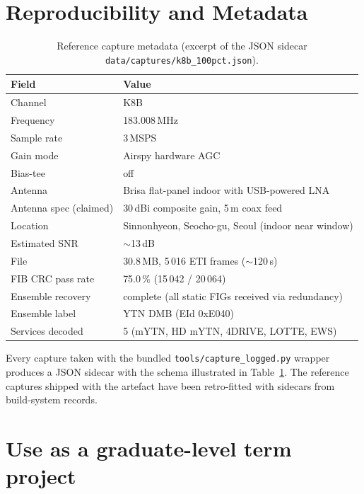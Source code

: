 \documentclass[11pt,a4paper]{article}
\begin{document}
\section{Reproducibility and Metadata}\label{sec:reproducibility}

\begin{table}[t]
\centering
\caption{Reference capture metadata (excerpt of the JSON sidecar
\texttt{data/captures/k8b\_100pct.json}).}
\label{tab:capture-meta}
\begin{tabular}{ll}
\toprule
Field & Value \\
\midrule
Channel              & K8B \\
Frequency            & 183.008\,MHz \\
Sample rate          & 3\,MSPS \\
Gain mode            & Airspy hardware AGC \\
Bias-tee             & off \\
Antenna              & Brisa flat-panel indoor with USB-powered LNA \\
Antenna spec (claimed)& 30\,dBi composite gain, 5\,m coax feed \\
Location             & Sinnonhyeon, Seocho-gu, Seoul (indoor near window) \\
Estimated SNR        & $\sim$13\,dB \\
File                 & 30.8\,MB, 5\,016 ETI frames ($\sim$120\,s) \\
FIB CRC pass rate    & 75.0\,\% (15\,042 / 20\,064) \\
Ensemble recovery    & complete (all static FIGs received via redundancy) \\
Ensemble label       & YTN DMB (EId 0xE040) \\
Services decoded     & 5 (mYTN, HD mYTN, 4DRIVE, LOTTE, EWS) \\
\bottomrule
\end{tabular}
\end{table}

Every capture taken with the bundled \texttt{tools/capture\_logged.py}
wrapper produces a JSON sidecar with the schema illustrated in
Table~\ref{tab:capture-meta}.  The reference captures shipped with the
artefact have been retro-fitted with sidecars from build-system records.

\section{Use as a graduate-level term project}\label{sec:education}
\end{document}
